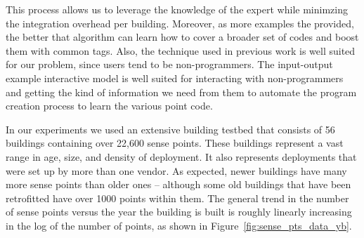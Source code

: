 This process allows us to leverage the knowledge of the expert while minimzing the integration
overhead per building.  Moreover, as more examples the provided, the better that 
algorithm can learn how to cover a broader set of codes and boost them with common tags.
Also, the technique used in previous work is well suited for our problem, since
users tend to be non-programmers.  The input-output example interactive model is well suited
for interacting with non-programmers and getting the kind of information we need from them
to automate the program creation process to learn the various point code. 


In our experiments we used an extensive building testbed that 
consists of 56 buildings containing over 22,600 sense points. These buildings 
represent a vast range in age, size, and density of deployment.  It also represents deployments
that were set up by more than one vendor.  As expected, newer buildings have many more sense 
points than older ones -- although some old buildings that have been retrofitted have over 1000  
points within them. The general trend in the number of sense points versus the year the 
building is built is roughly linearly increasing in the log of the number of points, as shown
in Figure~\ref{fig:sense_pts_data_yb}.  

